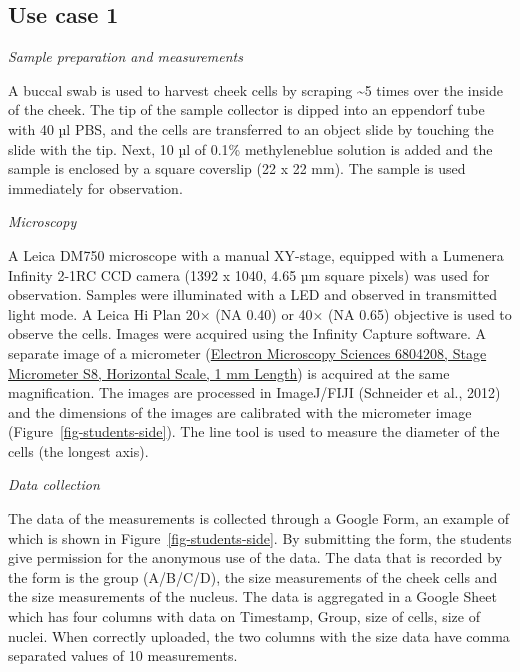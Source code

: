 \documentclass[
]{agujournal2019}
\begin{document}
\hypertarget{use-case-1}{%
\subsection*{Use case 1}\label{use-case-1}}

\emph{Sample preparation and measurements}

A buccal swab is used to harvest cheek cells by scraping
\textasciitilde5 times over the inside of the cheek. The tip of the
sample collector is dipped into an eppendorf tube with 40 µl PBS, and
the cells are transferred to an object slide by touching the slide with
the tip. Next, 10 µl of 0.1\% methyleneblue solution is added and the
sample is enclosed by a square coverslip (22 x 22 mm). The sample is
used immediately for observation.

\emph{Microscopy}

A Leica DM750 microscope with a manual XY-stage, equipped with a
Lumenera Infinity 2-1RC CCD camera (1392 x 1040, 4.65 µm square pixels)
was used for observation. Samples were illuminated with a LED and
observed in transmitted light mode. A Leica Hi Plan 20× (NA 0.40) or 40×
(NA 0.65) objective is used to observe the cells. Images were acquired
using the Infinity Capture software. A separate image of a micrometer
(\href{https://www.fishersci.com/shop/products/stage-graticules-s8/5028481}{Electron
Microscopy Sciences 6804208, Stage Micrometer S8, Horizontal Scale, 1 mm
Length}) is acquired at the same magnification. The images are processed
in ImageJ/FIJI (Schneider et al., 2012) and the dimensions of the images
are calibrated with the micrometer image
(Figure~\ref{fig-students-side}). The line tool is used to measure the
diameter of the cells (the longest axis).

\emph{Data collection}

The data of the measurements is collected through a Google Form, an
example of which is shown in Figure~\ref{fig-students-side}. By
submitting the form, the students give permission for the anonymous use
of the data. The data that is recorded by the form is the group
(A/B/C/D), the size measurements of the cheek cells and the size
measurements of the nucleus. The data is aggregated in a Google Sheet
which has four columns with data on Timestamp, Group, size of cells,
size of nuclei. When correctly uploaded, the two columns with the size
data have comma separated values of 10 measurements.
\end{document}
